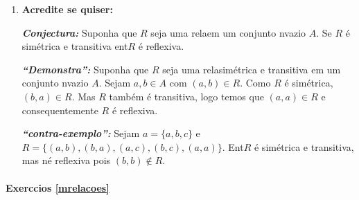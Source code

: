 \begin{enumerate}[{\bf 1.}]
\noindent \textit{\textbf{``Demonstra\caoi'':}} Seja $R$ uma rela\cao em um conjunto n\ao vazio $A$. Suponha $a,b\in A$ com $(a,b)\in R$. Como $R$ n\ao \'e sim\'etrica, $(b,a)\notin R$ logo $R$ \'e assim\'etrica.

\noindent \textit{\textbf{``contra-exemplo'':}} Sejam $A=\{1,2,3\}$ e $R=\{(1,2),(2,1),(1,3)\}$. Ent\ao $R$ n\ao \'e sim\'etrica nem assim\'etrica.

\item {\bf Acredite se quiser:}  

\noindent \textit{\textbf{Conjectura:}} Suponha que $R$ seja uma rela\cao em um conjunto n\ao vazio $A$. Se $R$ \'e sim\'etrica e transitiva ent\ao $R$ \'e reflexiva. 

\noindent \textit{\textbf{``Demonstra\caoi'':}} Suponha que $R$ seja uma rela\cao sim\'etrica e transitiva em um conjunto n\ao vazio $A$. Sejam $a,b\in A$ com $(a,b)\in R$. Como $R$ \'e sim\'etrica, $(b,a)\in R$. Mas $R$ tamb\'em \'e transitiva, logo temos que $(a,a)\in R$ e consequentemente $R$ \'e reflexiva.

\noindent \textit{\textbf{``contra-exemplo'':}} Sejam $a=\{a,b,c\}$ e $R=\{(a,b), (b,a), (a,c), (b,c), (a,a)\}$. Ent\ao $R$ \'e sim\'etrica e transitiva, mas n\ao \'e reflexiva pois $(b,b)\notin R$.
\end{enumerate}
\paragraph{Exerc\ih cios \ref{mrelacoes}}

